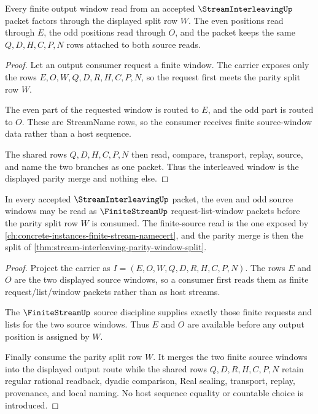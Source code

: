 \begin{theorem}
\label{thm:stream-interleaving-parity-window-split}
Every finite output window read from an accepted $\StreamInterleavingUp$ packet factors through the displayed split row $W$. The even positions read through $E$, the odd positions read through $O$, and the packet keeps the same $Q,D,H,C,P,N$ rows attached to both source reads.
\end{theorem}
\begin{proof}
Let an output consumer request a finite window. The carrier exposes only the rows $E,O,W,Q,D,R,H,C,P,N$, so the request first meets the parity split row $W$.

The even part of the requested window is routed to $E$, and the odd part is routed to $O$. These are StreamName rows, so the consumer receives finite source-window data rather than a host sequence.

The shared rows $Q,D,H,C,P,N$ then read, compare, transport, replay, source, and name the two branches as one packet. Thus the interleaved window is the displayed parity merge and nothing else.
\end{proof}

\begin{theorem}
\label{thm:stream-interleaving-finite-stream-source-window}
In every accepted $\StreamInterleavingUp$ packet, the even and odd source windows may be read as $\FiniteStreamUp$ request-list-window packets before the parity split row $W$ is consumed. The finite-source read is the one exposed by \autoref{ch:concrete-instances-finite-stream-namecert}, and the parity merge is then the split of \autoref{thm:stream-interleaving-parity-window-split}.
\end{theorem}
\begin{proof}
Project the carrier as $I=(E,O,W,Q,D,R,H,C,P,N)$. The rows $E$ and $O$ are the two displayed source windows, so a consumer first reads them as finite request/list/window packets rather than as host streams.

The $\FiniteStreamUp$ source discipline supplies exactly those finite requests and lists for the two source windows. Thus $E$ and $O$ are available before any output position is assigned by $W$.

Finally consume the parity split row $W$. It merges the two finite source windows into the displayed output route while the shared rows $Q,D,R,H,C,P,N$ retain regular rational readback, dyadic comparison, Real sealing, transport, replay, provenance, and local naming. No host sequence equality or countable choice is introduced.
\end{proof}

